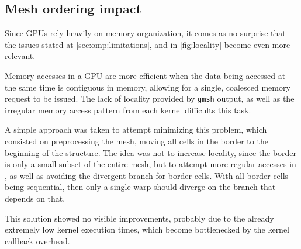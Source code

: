 \subsection{Mesh ordering impact}
\label{subsec:cuda:ordering}

Since GPUs rely heavily on memory organization, it comes as no surprise that the issues stated at \cref{sec:omp:limitations}, and in \cref{fig:locality} become even more relevant.

Memory accesses in a GPU are more efficient when the data being accessed at the same time is contiguous in memory, allowing for a single, coalesced memory request to be issued. The lack of locality provided by \texttt{gmsh} output, as well as the irregular memory access pattern from each kernel difficults this task.

A simple approach was taken to attempt minimizing this problem, which consisted on preprocessing the mesh, moving all cells in the border to the beginning of the structure. The idea was not to increase locality, since the border is only a small subset of the entire mesh, but to attempt more regular accesses in \computeflux, as well as avoiding the divergent branch for border cells. With all border cells being sequential, then only a single warp should diverge on the branch that depends on that.

This solution showed no visible improvements, probably due to the already extremely low kernel execution times, which become bottlenecked by the kernel callback overhead.
